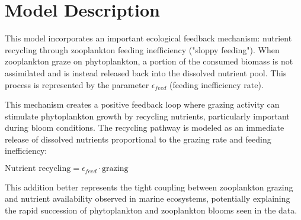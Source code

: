 \section{Model Description}

This model incorporates an important ecological feedback mechanism: nutrient recycling through zooplankton feeding inefficiency ("sloppy feeding"). When zooplankton graze on phytoplankton, a portion of the consumed biomass is not assimilated and is instead released back into the dissolved nutrient pool. This process is represented by the parameter $\epsilon_{feed}$ (feeding inefficiency rate).

This mechanism creates a positive feedback loop where grazing activity can stimulate phytoplankton growth by recycling nutrients, particularly important during bloom conditions. The recycling pathway is modeled as an immediate release of dissolved nutrients proportional to the grazing rate and feeding inefficiency:

$\text{Nutrient recycling} = \epsilon_{feed} \cdot \text{grazing}$

This addition better represents the tight coupling between zooplankton grazing and nutrient availability observed in marine ecosystems, potentially explaining the rapid succession of phytoplankton and zooplankton blooms seen in the data.
